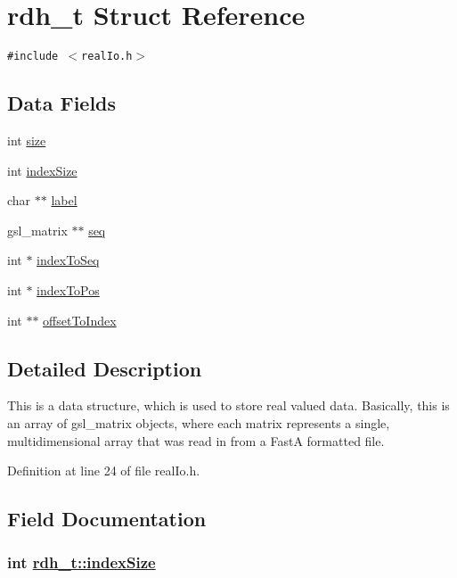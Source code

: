 \hypertarget{structrdh__t}{
\section{rdh\_\-t Struct Reference}
\label{structrdh__t}
}
{\tt \#include $<$real\-Io.h$>$}

\subsection*{Data Fields}
\begin{CompactItemize}
\item 
int \hyperlink{structrdh__t_o0}{size}
\item 
int \hyperlink{structrdh__t_o1}{index\-Size}
\item 
char $\ast$$\ast$ \hyperlink{structrdh__t_o2}{label}
\item 
gsl\_\-matrix $\ast$$\ast$ \hyperlink{structrdh__t_o3}{seq}
\item 
int $\ast$ \hyperlink{structrdh__t_o4}{index\-To\-Seq}
\item 
int $\ast$ \hyperlink{structrdh__t_o5}{index\-To\-Pos}
\item 
int $\ast$$\ast$ \hyperlink{structrdh__t_o6}{offset\-To\-Index}
\end{CompactItemize}


\subsection*{Detailed Description}
This is a data structure, which is used to store real valued data. Basically, this is an array of gsl\_\-matrix objects, where each matrix represents a single, multidimensional array that was read in from a Fast\-A formatted file.



Definition at line 24 of file real\-Io.h.

\subsection*{Field Documentation}
\hypertarget{structrdh__t_o1}{
\subsubsection[indexSize]{\setlength{\rightskip}{0pt plus 5cm}int \hyperlink{structrdh__t_o1}{rdh\_\-t::index\-Size}}}
\label{structrdh__t_o1}


